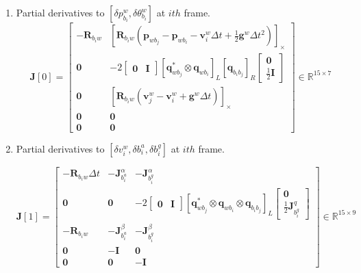 \documentclass[12pt]{report}   %
\begin{document}
\begin{enumerate}
	\item Partial derivatives to {\color{blue} $[\delta p^{w}_{b_{i}},\delta \theta ^{w}_{b_{i}}]$} at $ith$ frame.
	\begin{equation}
	\mathbf{J}[0]=
	\begin{bmatrix}
	-\mathbf{R}_{b_{i} w} & \left[\mathbf{R}_{b_{i} w}\left(\mathbf{p}_{w b_{j}}-\mathbf{p}_{w b_{i}}-\mathbf{v}_{i}^{w} \Delta t+\frac{1}{2} \mathbf{g}^{w} \Delta t^{2}\right)\right]_{\times} \\
	\mathbf{0} & -2\left[\begin{array}{ll}{\mathbf{0}} & {\mathbf{I}}\end{array}\right]\left[\mathbf{q}_{w b_{j}}^{*} \otimes \mathbf{q}_{w b_{i}}\right]_{L}\left[\mathbf{q}_{b_{i} b_{j}}\right]_{R}\left[\begin{array}{c}{\mathbf{0}} \\ {\frac{1}{2} \mathbf{I}}\end{array}\right] \\
	\mathbf{0} & \left[\mathbf{R}_{b_{i} w}\left(\mathbf{v}_{j}^{w}-\mathbf{v}_{i}^{w}+\mathbf{g}^{w} \Delta t\right)\right]_{\times} \\
	\mathbf{0} & \mathbf{0}  \\
	\mathbf{0} & \mathbf{0} 
	\end{bmatrix}
	\in \mathbb{R}^{15 \times 7}
	\end{equation}
	
	\item Partial derivatives to {\color{blue}$[\delta v^{w}_{i},\delta b^a_{i},\delta b^g_{i}]$} at $ith$ frame.
	
	\begin{equation}
	\mathbf{J}[1]=
	\begin{bmatrix}
	-\mathbf{R}_{b_{i} w} \Delta t & -\mathbf{J}_{b_{i}^{a}}^{\alpha} & -\mathbf{J}_{b_{i}^{g}}^{\alpha} \\
	\mathbf{0} & \mathbf{0} & -2\left[\begin{array}{ll}{\mathbf{0}} & {\mathbf{I}}\end{array}\right]\left[\mathbf{q}_{w b_{j}}^{*} \otimes \mathbf{q}_{w b_{i}} \otimes \mathbf{q}_{b_{i} b_{j}}\right]_{L}\left[\begin{array}{c}{\mathbf{0}} \\ {\frac{1}{2} \mathbf{J}_{b_{i}^{g}}^{q}}\end{array}\right] \\
	-\mathbf{R}_{b_{i} w} & -\mathbf{J}_{b_{i}^{a}}^{\beta} & -\mathbf{J}_{b_{i}^{g}}^{\beta} \\
	\mathbf{0} & -\mathbf{I}  &  \mathbf{0} \\
	\mathbf{0} &  \mathbf{0}  & -\mathbf{I}
	\end{bmatrix}
	\in \mathbb{R}^{15 \times 9}
	\end{equation}
	

\end{enumerate}
\end{document}
